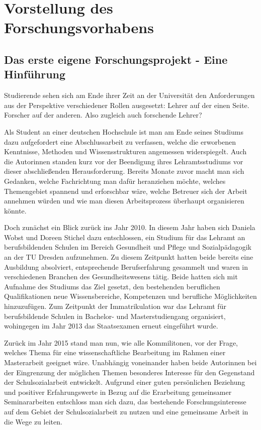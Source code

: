 \section{Vorstellung des Forschungsvorhabens}
\label{sec:VorstellungDesForschungsvorhabens}

\subsection{Das erste eigene Forschungsprojekt - Eine Hinführung}
\label{sec:DasErsteEigeneForschungsprojektEineHinführung}

Studierende sehen sich am Ende ihrer Zeit an der Universität den Anforderungen aus der Perspektive verschiedener Rollen ausgesetzt: Lehrer auf der einen Seite. Forscher auf der anderen. Also zugleich auch forschende Lehrer? 

Als Student an einer deutschen Hochschule ist man am Ende seines Studiums dazu aufgefordert eine Abschlussarbeit zu verfassen, welche die erworbenen Kenntnisse, Methoden und Wissensstrukturen angemessen widerspiegelt. Auch die Autorinnen standen kurz vor der Beendigung ihres Lehramtsstudiums vor dieser abschließenden Herausforderung. Bereits Monate zuvor macht man sich Gedanken, welche Fachrichtung man dafür heranziehen möchte, welches Themengebiet spannend und erforschbar wäre, welche Betreuer sich der Arbeit annehmen würden und wie man diesen Arbeitsprozess überhaupt organisieren könnte.

Doch zunächst ein Blick zurück ins Jahr 2010. In diesem Jahr haben sich Daniela Wobst und Doreen Stichel dazu entschlossen, ein Studium für das Lehramt an berufsbildenden Schulen im Bereich Gesundheit und Pflege und Sozialpädagogik an der TU Dresden aufzunehmen. Zu diesem Zeitpunkt hatten beide bereits eine Ausbildung absolviert, entsprechende Berufserfahrung gesammelt und waren in verschiedenen Branchen des Gesundheitswesens tätig. Beide hatten sich mit Aufnahme des Studiums das Ziel gesetzt, den bestehenden beruflichen Qualifikationen neue Wissensbereiche, Kompetenzen und berufliche Möglichkeiten hinzuzufügen. Zum Zeitpunkt der Immatrikulation war das Lehramt für berufsbildende Schulen in Bachelor- und Masterstudiengang organisiert, wohingegen im Jahr 2013 das Staatsexamen erneut eingeführt wurde. 

Zurück im Jahr 2015 stand man nun, wie alle Kommilitonen, vor der Frage, welches Thema für eine wissenschaftliche Bearbeitung im Rahmen einer Masterarbeit geeignet wäre. Unabhängig voneinander haben beide Autorinnen bei der Eingrenzung der möglichen Themen besonderes Interesse für den Gegenstand der Schulsozialarbeit entwickelt. Aufgrund einer guten persönlichen Beziehung und positiver Erfahrungswerte in Bezug auf die Erarbeitung gemeinsamer Seminararbeiten entschloss man sich dazu, das bestehende Forschungsinteresse auf dem Gebiet der Schulsozialarbeit zu nutzen und eine gemeinsame Arbeit in die Wege zu leiten. 

